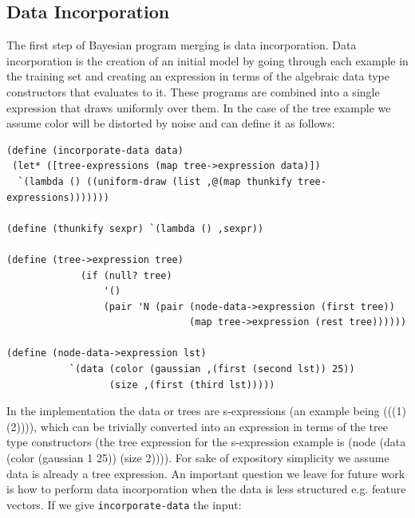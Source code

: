 \documentclass[a4paper,10pt]{article}
\begin{document}
\subsection{Data Incorporation}
The first step of Bayesian program merging is data incorporation.  Data incorporation is the creation of an initial model by going through each example in the training set and creating an expression in terms of the algebraic data type constructors that evaluates to it.  These programs are combined into a single expression that draws uniformly over them.  In the case of the tree example we assume color will be distorted by noise and can define it as follows:
\begin{lstlisting}[frame=trBLsingle]
(define (incorporate-data data)
 (let* ([tree-expressions (map tree->expression data)])
  `(lambda () ((uniform-draw (list ,@(map thunkify tree-expressions)))))))

(define (thunkify sexpr) `(lambda () ,sexpr))

(define (tree->expression tree)
             (if (null? tree)
                 '()
                 (pair 'N (pair (node-data->expression (first tree)) 
                                (map tree->expression (rest tree))))))

(define (node-data->expression lst)
           `(data (color (gaussian ,(first (second lst)) 25))
                  (size ,(first (third lst)))))
\end{lstlisting}
In the implementation the data or trees are s-expressions (an example being (((1) (2)))), which can be trivially converted into an expression in terms of the tree type constructors (the tree expression for the s-expression example is (node (data (color (gaussian 1 25)) (size 2)))).  For sake of expository simplicity we assume data is already a tree expression.  An important question we leave for future work is how to perform data incorporation when the data is less structured e.g. feature vectors.  If we give \texttt{incorporate-data} the input: 
\end{document}
